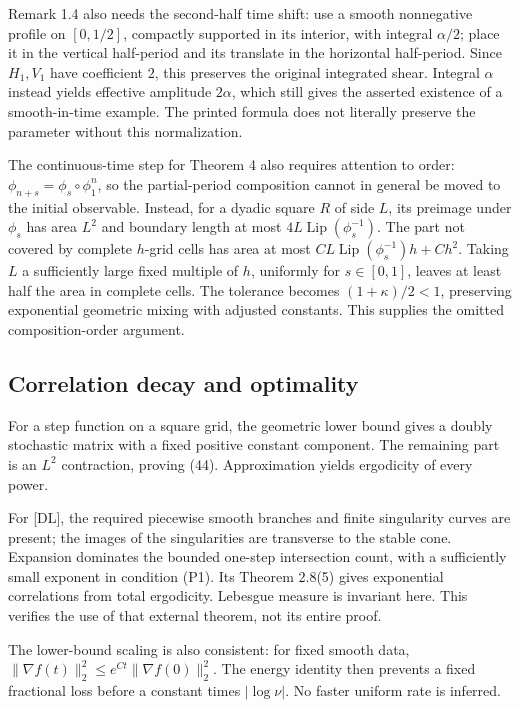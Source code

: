 \documentclass[10pt]{article}
\begin{document}
Remark 1.4 also needs the second-half time shift: use a smooth nonnegative profile on \([0,1/2]\), compactly supported in its interior, with integral \(\alpha/2\); place it in the vertical half-period and its translate in the horizontal half-period. Since \(H_1,V_1\) have coefficient \(2\), this preserves the original integrated shear. Integral \(\alpha\) instead yields effective amplitude \(2\alpha\), which still gives the asserted existence of a smooth-in-time example. The printed formula does not literally preserve the parameter without this normalization.\par
The continuous-time step for Theorem 4 also requires attention to order: \(\phi_{n+s}=\phi_s\circ\phi_1^n\), so the partial-period composition cannot in general be moved to the initial observable. Instead, for a dyadic square \(R\) of side \(L\), its preimage under \(\phi_s\) has area \(L^2\) and boundary length at most \(4L\operatorname{Lip}(\phi_s^{-1})\). The part not covered by complete \(h\)-grid cells has area at most \(C L\operatorname{Lip}(\phi_s^{-1})h+Ch^2\). Taking \(L\) a sufficiently large fixed multiple of \(h\), uniformly for \(s\in[0,1]\), leaves at least half the area in complete cells. The tolerance becomes \((1+\kappa)/2<1\), preserving exponential geometric mixing with adjusted constants. This supplies the omitted composition-order argument.\par
\subsection*{Correlation decay and optimality}
For a step function on a square grid, the geometric lower bound gives a doubly stochastic matrix with a fixed positive constant component. The remaining part is an \(L^2\) contraction, proving (44). Approximation yields ergodicity of every power.\par
For [DL], the required piecewise smooth branches and finite singularity curves are present; the images of the singularities are transverse to the stable cone. Expansion dominates the bounded one-step intersection count, with a sufficiently small exponent in condition (P1). Its Theorem 2.8(5) gives exponential correlations from total ergodicity. Lebesgue measure is invariant here. This verifies the use of that external theorem, not its entire proof.\par
The lower-bound scaling is also consistent: for fixed smooth data, \(\|\nabla f(t)\|_2^2\le e^{Ct}\|\nabla f(0)\|_2^2\). The energy identity then prevents a fixed fractional loss before a constant times \(|\log\nu|\). No faster uniform rate is inferred.\par
\end{document}
